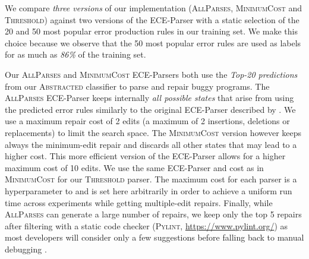 
We compare \emph{three versions} of our \toolname implementation
(\textsc{AllParses}, \textsc{MinimumCost} and \textsc{Threshold}) against two
versions of the ECE-Parser with a static selection of the 20 and 50 most popular
error production rules in our training set. We make this choice because we
observe that the 50 most popular error rules are used as labels for as much as
\emph{86\%} of the training set.

Our \textsc{AllParses} and \textsc{MinimumCost} ECE-Parsers both use the
\emph{Top-20 predictions} from our \textsc{Abstracted} classifier to parse and
repair buggy programs. The \textsc{AllParses} ECE-Parser keeps internally
\emph{all possible states} that arise from using the predicted error rules
similarly to the original ECE-Parser described by \citet{Aho_1972}. We use a
maximum repair cost of 2 edits (\ie a maximum of 2 insertions, deletions or
replacements) to limit the search space. The \textsc{MinimumCost} version
however keeps always the minimum-edit repair and discards all other states that
may lead to a higher cost. This more efficient version of the ECE-Parser allows
for a higher maximum cost of 10 edits. We use the same ECE-Parser and cost as in
\textsc{MinimumCost} for our \textsc{Threshold} parser. The maximum cost for
each parser is a hyperparameter to \toolname and is set here arbitrarily in
order to achieve a uniform run time across experiments while getting
multiple-edit repairs. Finally, while \textsc{AllParses} can generate a large
number of repairs, we keep only the top 5 repairs after filtering with a static
code checker (\textsc{Pylint}, \url{https://www.pylint.org/}) as most developers
will consider only a few suggestions before falling back to manual debugging
\citep{Kochhar2016-oc, Parnin2011-ce}.

